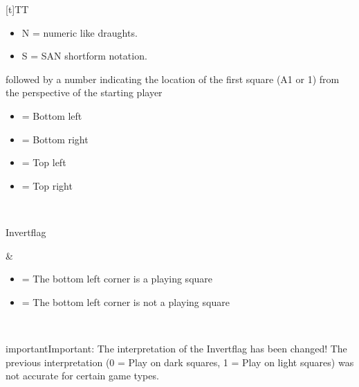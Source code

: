 \documentclass[letterpaper,10pt,english]{sphinxmanual}
\begin{document}
\begin{savenotes}
\begin{tabulary}{\linewidth}[t]{TT}
\begin{varwidth}[t]{}
\begin{itemize}
\item {} 
\sphinxAtStartPar
N = numeric like draughts.

\item {} 
\sphinxAtStartPar
S = SAN \sphinxhyphen{} short\sphinxhyphen{}form notation.

\end{itemize}

\sphinxAtStartPar
followed by a number indicating the location of the
first square (A1 or 1) from the perspective of the
starting player
\begin{itemize}
\item {} 
 = Bottom left

\item {} 
 = Bottom right

\item {} 
 = Top left

\item {} 
 = Top right

\end{itemize}
\sphinxbeforeendvarwidth
\end{varwidth}%
\\
\sphinxhline\begin{varwidth}[t]{}
\sphinxAtStartPar
Invert\sphinxhyphen{}flag
\sphinxbeforeendvarwidth
\end{varwidth}%
&\begin{varwidth}[t]{}
\begin{itemize}
\item {} 
 = The bottom left corner is a playing square

\item {} 
 = The bottom left corner is not a playing square

\end{itemize}
\sphinxbeforeendvarwidth
\end{varwidth}%
\\
\sphinxbottomrule
\end{tabulary}
\sphinxtableafterendhook\par
\sphinxattableend\end{savenotes}

\begin{sphinxadmonition}{important}{Important:}
\sphinxAtStartPar
The interpretation of the Invert\sphinxhyphen{}flag has been changed! The previous
interpretation (0 = Play on dark squares, 1 = Play on light squares)
was not accurate for certain game types.
\end{sphinxadmonition}
\end{document}
